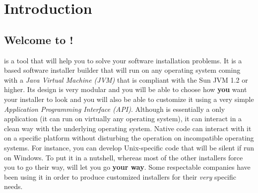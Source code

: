 \chapter*{Introduction}

\section*{Welcome to \IzPack !}

\IzPack is a tool that will help you to solve your software installation
problems. It is a \Java based software installer builder that will run
on any operating system coming with a \textit{Java Virtual Machine
(JVM)} that is compliant with the Sun JVM 1.2 or higher. Its design is
very modular and you will be able to choose how \textbf{you} want your
installer to look and you will also be able to customize it using a very
simple \textit{Application Programming Interface (API)}. Although
\IzPack is essentially a \Java only application (it can run on virtually
any operating system), it can interact in a clean way with the
underlying operating system. Native code can interact with it on a
specific platform without disturbing the operation on incompatible
operating systems. For instance, you can develop Unix-specific code that
will be silent if run on Windows. To put it in a nutshell, whereas most
of the other \Java installers force you to go their way, \IzPack will
let you go \textbf{your way}. Some respectable companies have been using
it in order to produce customized  installers for their \textsl{very}
specific needs.\\

